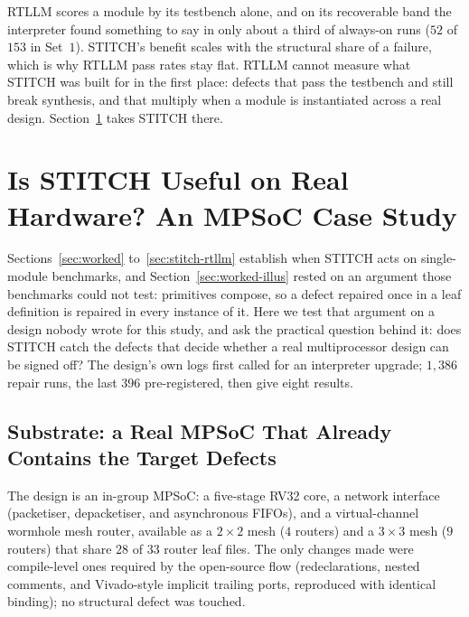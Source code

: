 \documentclass[11pt]{article}
\begin{document}
RTLLM scores a module by its testbench alone, and on its recoverable band the
interpreter found something to say in only about a third of always-on runs
($52$ of $153$ in Set~$1$). STITCH's benefit scales with the structural share
of a failure, which is why RTLLM pass rates stay flat. RTLLM cannot measure
what STITCH was built for in the first place: defects that pass the testbench
and still break synthesis, and that multiply when a module is instantiated
across a real design. Section~\ref{sec:mpsoc} takes STITCH there.

\section{Is STITCH Useful on Real Hardware? An MPSoC Case Study}
\label{sec:mpsoc}

Sections~\ref{sec:worked} to~\ref{sec:stitch-rtllm} establish when STITCH acts
on single-module benchmarks, and Section~\ref{sec:worked-illus} rested on an
argument those benchmarks could not test: primitives compose, so a defect
repaired once in a leaf definition is repaired in every instance of it. Here
we test that argument on a design nobody wrote for this study, and ask the
practical question behind it: does STITCH catch the defects that decide
whether a real multiprocessor design can be signed off? The design's own logs first called for an interpreter upgrade;
$1{,}386$ repair runs, the last $396$ pre-registered, then give eight results.

\subsection{Substrate: a Real MPSoC That Already Contains the Target Defects}
\label{sec:mpsoc-substrate}

The design is an in-group MPSoC: a five-stage RV32 core, a network interface
(packetiser, depacketiser, and asynchronous FIFOs), and a virtual-channel
wormhole mesh router, available as a $2{\times}2$ mesh ($4$ routers) and a
$3{\times}3$ mesh ($9$ routers) that share $28$ of $33$ router leaf files. The
only changes made were compile-level ones required by the open-source flow
(redeclarations, nested comments, and Vivado-style implicit trailing ports,
reproduced with identical binding); no structural defect was touched.
\end{document}
